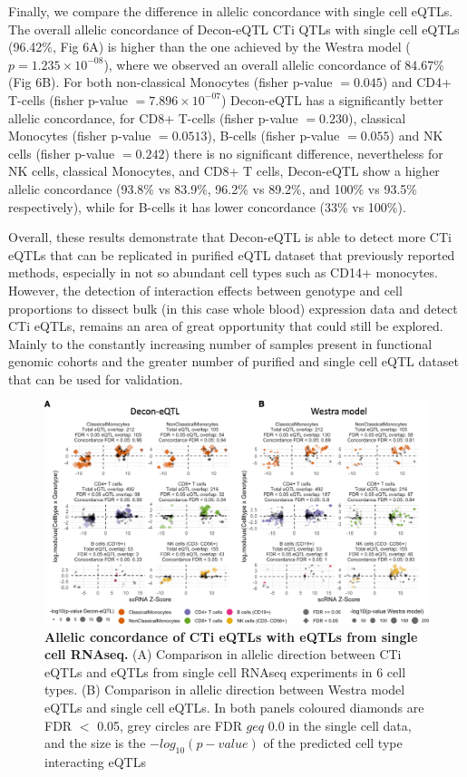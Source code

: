 Finally, we compare the difference in allelic concordance with single cell eQTLs. The overall allelic concordance of Decon-eQTL CTi QTLs with single cell eQTLs (96.42\%, Fig 6A) is higher than the one achieved by the Westra model ($p = 1.235 \times 10^{-08}$), where we observed an overall allelic concordance of 84.67\% (Fig 6B). For both non-classical Monocytes (fisher p-value $= 0.045$) and CD4+ T-cells (fisher p-value $= 7.896 \times 10^{-07}$) Decon-eQTL has a significantly better allelic concordance, for CD8+ T-cells (fisher p-value $= 0.230$), classical Monocytes (fisher p-value $= 0.0513$), B-cells (fisher p-value $= 0.055$) and NK cells (fisher p-value $= 0.242$) there is no significant difference, nevertheless for NK cells, classical Monocytes, and CD8+ T cells, Decon-eQTL show a higher allelic concordance (93.8\% vs 83.9\%, 96.2\% vs 89.2\%, and 100\% vs 93.5\% respectively), while for B-cells it has lower concordance (33\% vs 100\%).

Overall, these results demonstrate that Decon-eQTL is able to detect more CTi eQTLs that can be replicated in purified eQTL dataset that previously reported methods, especially in not so abundant cell types such as CD14+ monocytes. However, the detection of interaction effects between genotype and cell proportions to dissect bulk (in this case whole blood) expression data and detect CTi eQTLs, remains an area of great opportunity that could still be explored. Mainly to the constantly increasing  number of samples present in functional genomic cohorts and the greater number of purified and single cell eQTL dataset that can be used for validation. 

\begin{figure}[H]
	\includegraphics[width=\textwidth]{chapters/chapter4-deconvolution/img/fig6.png}
	\caption{\textbf{Allelic concordance of CTi eQTLs with eQTLs from single cell RNAseq.} (A) Comparison in allelic direction between CTi eQTLs and eQTLs from single cell RNAseq experiments in 6 cell types. (B) Comparison in allelic direction between Westra model eQTLs and single cell eQTLs. In both panels coloured diamonds are FDR $<$ 0.05, grey circles are FDR $geq$ 0.0 in the single cell data, and the size is the $-log_{10}(p-value)$ of the predicted cell type interacting eQTLs}
\end{figure}

